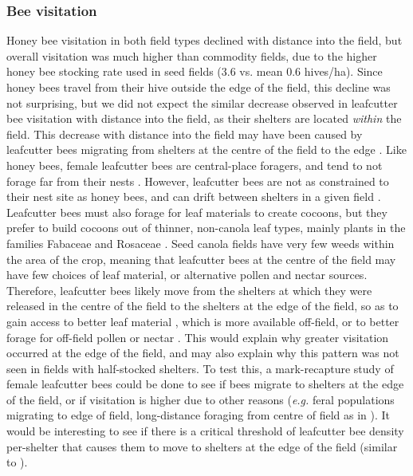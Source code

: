 \documentclass[12pt]{article} %
\begin{document}
\subsubsection{Bee visitation} 
Honey bee visitation in both field types declined with distance into the field, but overall visitation was much higher than commodity fields, due to the higher honey bee stocking rate used in seed fields (3.6 vs. mean 0.6 hives/ha).
Since honey bees travel from their hive outside the edge of the field, this decline was not surprising, but we did not expect the similar decrease observed in leafcutter bee visitation with distance into the field, as their shelters are located \textit{within} the field.
This decrease with distance into the field may have been caused by leafcutter bees migrating from shelters at the centre of the field to the edge \citep{goerzen1995}.
Like honey bees, female leafcutter bees are central-place foragers, and tend to not forage far from their nests \citep{peterson2005,pitts2011, brunet2019}.
However, leafcutter bees are not as constrained to their nest site as honey bees, and can drift between shelters in a given field \citep{goerzen1995, pittsSinger2013}.
Leafcutter bees must also forage for leaf materials to create cocoons, but they prefer to build cocoons out of thinner, non-canola leaf types, mainly plants in the families Fabaceae and Rosaceae \citep{sinu2018}.
Seed canola fields have very few weeds within the area of the crop, meaning that leafcutter bees at the centre of the field may have few choices of leaf material, or alternative pollen and nectar sources.
Therefore, leafcutter bees likely move from the shelters at which they were released in the centre of the field to the shelters at the edge of the field, so as to gain access to better leaf material \citep{horne1995}, which is more available off-field, or to better forage for off-field pollen or nectar \citep{horne1995b}.
This would explain why greater visitation occurred at the edge of the field, and may also explain why this pattern was not seen in fields with half-stocked shelters.
To test this, a mark-recapture study of female leafcutter bees could be done to see if bees migrate to shelters at the edge of the field, or if visitation is higher due to other reasons (\textit{e.g.} feral populations migrating to edge of field, long-distance foraging from centre of field as in \citealp{peterson2005}).  %
It would be interesting to see if there is a critical threshold of leafcutter bee density per-shelter that causes them to move to shelters at the edge of the field (similar to \citealp{pittsSinger2013}).
\end{document}
